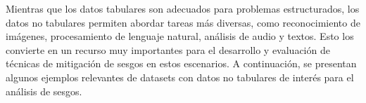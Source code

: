     Mientras que los datos tabulares son adecuados para problemas estructurados, los datos no tabulares permiten abordar tareas m\'as diversas, 
    como reconocimiento de im\'agenes, procesamiento de lenguaje natural, an\'alisis de audio y textos. Esto los convierte en un recurso muy importantes
    para el desarrollo y evaluaci\'on de t\'ecnicas de mitigaci\'on de sesgos en estos escenarios. A continuaci\'on, se presentan algunos ejemplos 
    relevantes de datasets con datos no tabulares de inter\'es para el an\'alisis de sesgos.


    \begin{table}[htpb]
        \centering
\end{table}
